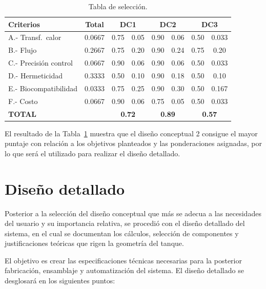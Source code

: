 \documentclass[11pt,tesis,twoside,openright,spanish]{upiiztt}
\begin{document}
\begin{table}[H]
\centering
\caption{Tabla de selección.}
\label{tab:seleccion}
\begin{tabular}{lccccccc}
\toprule
\textbf{Criterios} & \textbf{Total} & \multicolumn{2}{c}{\textbf{DC1}} & \multicolumn{2}{c}{\textbf{DC2}} & \multicolumn{2}{c}{\textbf{DC3}} \\
\midrule
A.- Transf.\ calor    & 0.0667 & 0.75 & 0.05 & 0.90 & 0.06 & 0.50 & 0.033 \\
B.- Flujo              & 0.2667 & 0.75 & 0.20 & 0.90 & 0.24 & 0.75 & 0.20  \\
C.- Precisión control  & 0.0667 & 0.90 & 0.06 & 0.90 & 0.06 & 0.50 & 0.033 \\
D.- Hermeticidad       & 0.3333 & 0.50 & 0.10 & 0.90 & 0.18 & 0.50 & 0.10  \\
E.- Biocompatibilidad  & 0.0333 & 0.75 & 0.25 & 0.90 & 0.30 & 0.50 & 0.167 \\
F.- Costo              & 0.0667 & 0.90 & 0.06 & 0.75 & 0.05 & 0.50 & 0.033 \\
\midrule
\textbf{TOTAL}         &        & \multicolumn{2}{c}{\textbf{0.72}} & \multicolumn{2}{c}{\textbf{0.89}} & \multicolumn{2}{c}{\textbf{0.57}} \\
\bottomrule
\end{tabular}
\end{table}

El resultado de la Tabla~\ref{tab:seleccion} muestra que el diseño conceptual 2 consigue el mayor
puntaje con relación a los objetivos planteados y las ponderaciones asignadas, por
lo que será el utilizado para realizar el diseño detallado.

\chapter{Diseño detallado}\label{cap8}

Posterior a la selección del diseño conceptual que más se adecua a las
necesidades del usuario y su importancia relativa, se procedió con el diseño
detallado del sistema, en el cual se documentan los cálculos, selección de
componentes y justificaciones teóricas que rigen la geometría del tanque.

El objetivo es crear las especificaciones técnicas necesarias para la posterior
fabricación, ensamblaje y automatización del sistema. El diseño detallado se
desglosará en los siguientes puntos:
\end{document}
